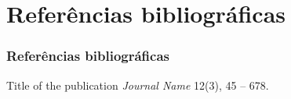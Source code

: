 \documentclass{beamer}
\begin{document}

\section{Referências bibliográficas}
\begin{frame}
    \frametitle{Referências bibliográficas}
    \footnotesize{
    \begin{thebibliography}{99} %
    \newblock Title of the publication
    \newblock \emph{Journal Name} 12(3), 45 -- 678.
    \end{thebibliography}
    }
\end{frame}

\end{document}
